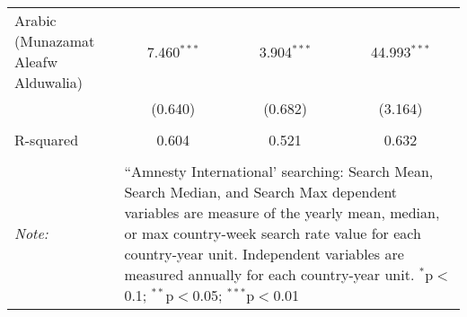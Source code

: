 \begin{table}[!htbp]
\begin{tabular}{@{\extracolsep{5pt}}lccc}
  Arabic (Munazamat Aleafw Alduwalia) & 7.460$^{***}$ & 3.904$^{***}$ & 44.993$^{***}$ \\ 
  & (0.640) & (0.682) & (3.164) \\ 
 \hline \\[-1.8ex] 
R-squared  & 0.604 & 0.521 & 0.632 \\ 
\hline 
\hline \\[-1.8ex] 
\textit{Note:}  & \multicolumn{3}{l}{\parbox[t]{8cm}{``Amnesty International' searching: Search Mean, Search Median, and Search Max dependent variables are measure of the yearly mean, median, or max country-week search rate value for each country-year unit. Independent variables are measured annually for each country-year unit. $^{*}$p$<$0.1; $^{**}$p$<$0.05; $^{***}$p$<$0.01}} \\ 
\end{tabular} 
\end{table} 

